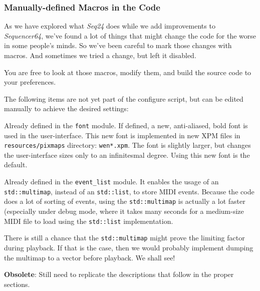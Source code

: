 \subsubsection{Manually-defined Macros in the Code}
\label{subsubsec:seq64_build_macros}

   As we have explored what \textsl{Seq24} does while we add improvements to
   \textsl{Sequencer64}, we've found a lot of things that might change
   the code for the worse in some people's minds.  So we've been careful to
   mark those changes with macros.  And sometimes we tried a change, but left
   it disabled.

   You are free to look at those macros, modify them, and build the source code
   to your preferences.

   The following items are not yet part of the configure script, but can
   be edited manually to achieve the desired settings:

   \setcounter{ItemCounter}{0}      %
   
        Already defined in the \texttt{font} module.
        If defined, a new, anti-aliased,
        bold font is used in the user-interface.  This new font is implemented
        in new XPM files in \texttt{resources/pixmaps} directory:
        \texttt{wen*.xpm}.  The font is slightly
        larger, but changes the user-interface sizes only to an infinitesmal
        degree.  Using this new font is the default.

        Already defined in the \texttt{event\_list} module.
        It enables the usage of an
        \texttt{std::multimap}, instead of an \texttt{std::list},
        to store MIDI events.  Because
        the code does a lot of sorting of events, using the
        \texttt{std::multimap} is actually a lot faster (especially under debug
        mode, where it takes
        many seconds for a medium-size MIDI file to load using the
        \texttt{std::list} implementation.

        There is still a chance that the \texttt{std::multimap} might prove the
        limiting factor during playback.  If that is the case, then we would
        probably implement dumping the multimap to a vector before playback.
        We shall see!

   \textbf{Obsolete}:  Still need to replicate the descriptions that follow
      in the proper sections.

